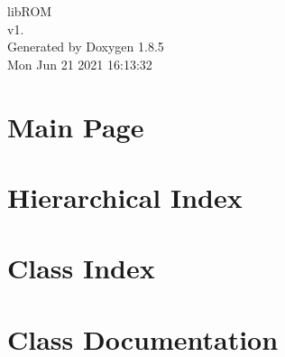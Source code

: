 \documentclass[twoside]{book}
\newcommand{\clearemptydoublepage}{%
  \newpage{\pagestyle{empty}\cleardoublepage}%
}
\begin{document}
\hypersetup{pageanchor=false}
\begin{titlepage}
\vspace*{7cm}
\begin{center}%
{\Large lib\-R\-O\-M \\[1ex]\large v1. }\\
\vspace*{1cm}
{\large Generated by Doxygen 1.8.5}\\
\vspace*{0.5cm}
{\small Mon Jun 21 2021 16:13:32}\\
\end{center}
\end{titlepage}
\clearemptydoublepage
\tableofcontents
\clearemptydoublepage
{}
\hypersetup{pageanchor=true}

\chapter{Main Page}
\label{index}\hypertarget{index}{}
\chapter{Hierarchical Index}

\chapter{Class Index}

\chapter{Class Documentation}





















\newpage
{}
{}
\printindex
\end{document}
